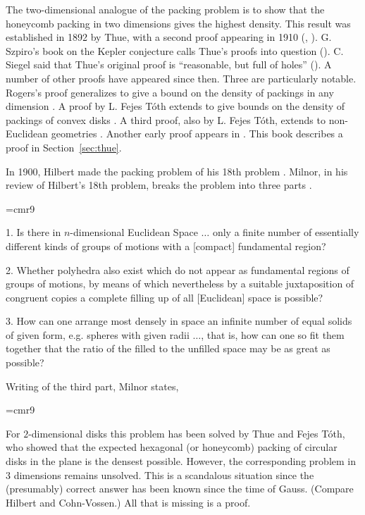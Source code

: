 The two-dimensional analogue of the packing problem is to show
that the honeycomb packing in two dimensions gives the highest
density.  This result was established in 1892 by Thue, 
with a second
proof appearing in 1910 (\cite{Thu92}, \cite{Thu10}). G. Szpiro's
book on the Kepler conjecture calls Thue's proofs into question
(\cite{Szp02}).  C. Siegel 
said that Thue's original proof is
``reasonable, but full of holes'' (\cite{Szp02}). A number of other
proofs have appeared since then. Three are particularly notable.
Rogers's proof generalizes to give a bound on the density of
packings in any dimension \cite{Rog58}. A proof by L. Fejes T\'oth
extends to give bounds on the density of packings of convex disks
\cite{Fej50}. A third proof, also by L. Fejes T\'oth, extends to
non-Euclidean geometries \cite{Fej53}. Another early proof appears
in \cite{SeM44}.  This book describes a proof in Section~\ref{sec:thue}.

In 1900, Hilbert made the packing problem of his 18th
problem \cite{hilbert}. Milnor, 
 in his review of Hilbert's 18th
problem, breaks the problem into three parts \cite{Mil76}.

{
\narrower
\font\ninerm=cmr9
\ninerm

1.  Is there in $n$-dimensional Euclidean Space $\ldots$ only a finite
number of essentially different kinds of groups of motions with a
[compact] fundamental region?

2.  Whether polyhedra also exist which do not appear as fundamental
    regions of groups of motions, by means of which nevertheless
    by a suitable juxtaposition of congruent copies a complete filling
    up of all [Euclidean] space is possible?

3.  How can one arrange most densely in space an infinite number
    of equal solids of given form, e.g. spheres with given radii $\ldots$,
    that is, how can one so fit them together that the ratio of the
    filled to the unfilled space may be as great as possible?

}

\smallskip
Writing of the third part, Milnor states,

{
\narrower
\font\ninerm=cmr9
\ninerm

For $2$-dimensional disks this problem has been solved by Thue and
Fejes T\'oth, who showed that the expected hexagonal (or honeycomb)
packing of circular disks in the plane is the densest possible.
However, the corresponding problem in $3$ dimensions remains
unsolved. This is a scandalous situation since the (presumably)
correct answer has been known since the time of Gauss. (Compare
Hilbert and Cohn-Vossen.)  All that is missing is a proof.
}

